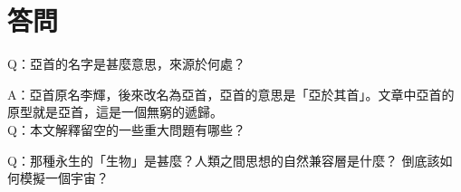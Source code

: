 \chapter{答問}



Q：亞首的名字是甚麼意思，來源於何處？

A：亞首原名李輝，後來改名為亞首，亞首的意思是「亞於其首」。文章中亞首的原型就是亞首，這是一個無窮的遞歸。
\\

Q：本文解釋留空的一些重大問題有哪些？

Q：那種永生的「生物」是甚麼？人類之間思想的自然兼容層是什麼？ 倒底該如何模擬一個宇宙？%

